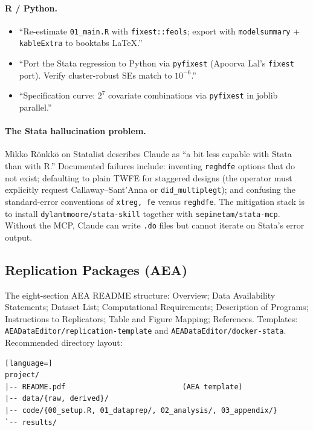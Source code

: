 \documentclass[11pt]{article}
\begin{document}
\paragraph{R / Python.}
\begin{itemize}[leftmargin=*,nosep]
    \item ``Re-estimate \texttt{01\_main.R} with \texttt{fixest::feols}; export with \texttt{modelsummary} + \texttt{kableExtra} to booktabs LaTeX.''
    \item ``Port the Stata regression to Python via \texttt{pyfixest} (Apoorva Lal's \texttt{fixest} port). Verify cluster-robust SEs match to $10^{-6}$.''
    \item ``Specification curve: $2^7$ covariate combinations via \texttt{pyfixest} in joblib parallel.''
\end{itemize}

\paragraph{The Stata hallucination problem.} Mikko R\"onkk\"o on Statalist describes Claude as ``a bit less capable with Stata than with R.'' Documented failures include: inventing \texttt{reghdfe} options that do not exist; defaulting to plain TWFE for staggered designs (the operator must explicitly request Callaway--Sant'Anna or \texttt{did\_multiplegt}); and confusing the standard-error conventions of \texttt{xtreg, fe} versus \texttt{reghdfe}. The mitigation stack is to install \texttt{dylantmoore/stata-skill} together with \texttt{sepinetam/stata-mcp}. Without the MCP, Claude can write \texttt{.do} files but cannot iterate on Stata's error output.

\subsection{Replication Packages (AEA)}

The eight-section AEA README structure: Overview; Data Availability Statements; Dataset List; Computational Requirements; Description of Programs; Instructions to Replicators; Table and Figure Mapping; References. Templates: \texttt{AEADataEditor/replication-template} and \texttt{AEADataEditor/docker-stata}. Recommended directory layout:

\begin{lstlisting}[language=]
project/
|-- README.pdf                           (AEA template)
|-- data/{raw, derived}/
|-- code/{00_setup.R, 01_dataprep/, 02_analysis/, 03_appendix/}
`-- results/
\end{lstlisting}
\end{document}
